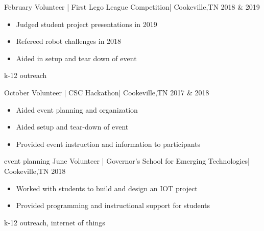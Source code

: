 %
%
%


\begin{experiences}
      \experience
    {February} {Volunteer | First Lego League Competition}{| Cookeville,}{TN}
    {2018 \& 2019} {
                    \begin{itemize}
                        \item {Judged student project presentations in 2019}
                        \item {Refereed robot challenges in 2018}
                        \item {Aided in setup and tear down of event}
                    \end{itemize}
                    }
                    {k-12 outreach}

   \emptySeparator
  
    \experience
    {October} {Volunteer | CSC Hackathon}{| Cookeville,}{TN}
    {2017 \& 2018} {
                      \begin{itemize}
                        \item {Aided event planning and organization}
                        \item {Aided setup and tear-down of event}
                        \item {Provided event instruction and information to participants}
                      \end{itemize}
                    }
                    {event planning}
    \emptySeparator
    \experience
    {June} {Volunteer | Governor's School for Emerging Technologies}{| Cookeville,}{TN}
    {2018} {
                    \begin{itemize}
                        \item {Worked with students to build and design an IOT project}
                        \item {Provided programming and instructional support for students}
                    \end{itemize}
                    }
                    {k-12 outreach, internet of things}
  \emptySeparator
  

\end{experiences}
